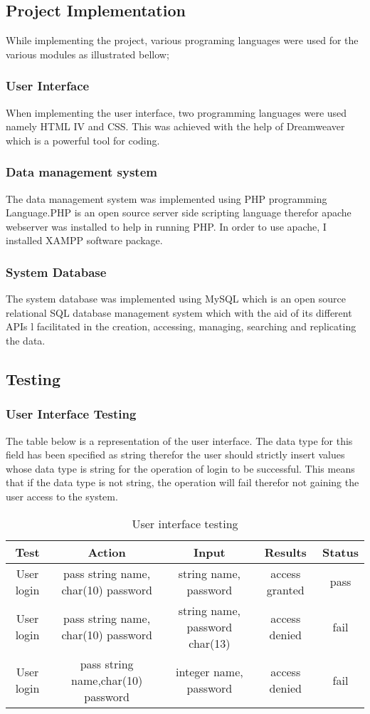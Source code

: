 \documentclass{article}
\begin{document}
\subsection{Project Implementation}
While implementing the project, various programing languages were  used for the various modules as illustrated bellow;
\subsubsection{User Interface}
When implementing the user interface, two programming languages were  used namely  HTML IV and CSS. This was achieved with the help of Dreamweaver which is a powerful tool for coding.
\subsubsection{Data management system}
The data management system was implemented using PHP programming
Language.PHP is an open source server side scripting language therefor apache webserver was installed to help in running PHP. In order to use apache, I installed XAMPP software package.
\subsubsection{System Database}
The system database was implemented using MySQL which is an open source relational SQL database management system which with the aid of its different APIs l facilitated in the creation, accessing, managing, searching and replicating the data.
\subsection{Testing}
\subsubsection{User Interface Testing}
The table below is a representation of the user interface. The data type for this field has been specified as string therefor the user should strictly insert values whose data type is string for the operation of login to be successful. This means that if the data type is not string, the operation will fail therefor not gaining the user access to the system.
\begin{table}[ht]
\centering
\caption{User interface testing}
\begin{tabular}{|c|c|c|c|c|}
\hline
Test & Action & Input & Results & Status \\
\hline
\hline
User login & pass string name, char(10) password & string name, password  & access granted & pass\\
User login & pass string name, char(10) password & string name, password char(13) & access denied & fail\\
User login & pass string name,char(10) password & integer name, password  & access denied & fail\\
\end{tabular}

\end{table}
\end{document}
